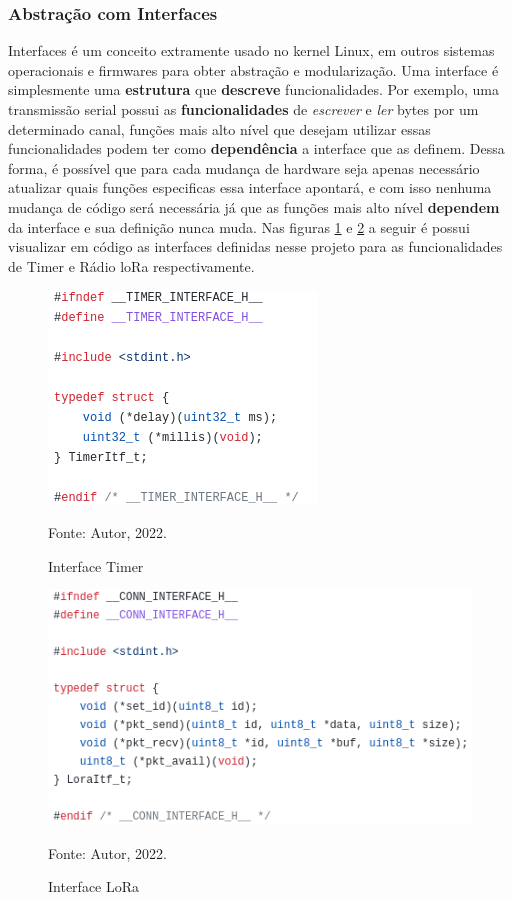\subsubsection{Abstração com Interfaces}

Interfaces é um conceito extramente usado no kernel Linux, em outros sistemas
operacionais e firmwares para obter abstração e modularização. Uma interface
é simplesmente uma \textbf{estrutura} que \textbf{descreve} funcionalidades. Por exemplo,
uma transmissão serial possui as \textbf{funcionalidades} de \textit{escrever}
e \textit{ler} bytes por um determinado canal, funções mais alto nível que desejam
utilizar essas funcionalidades podem ter como \textbf{dependência} a interface
que as definem. Dessa forma, é possível que para cada mudança de hardware
seja apenas necessário atualizar quais funções especificas essa interface apontará,
e com isso nenhuma mudança de código será necessária já que as funções mais alto
nível \textbf{dependem} da interface e sua definição nunca muda. Nas figuras
\ref{fig:itf-timer} e \ref{fig:itf-lora} a seguir é possui visualizar em código as interfaces
definidas nesse projeto para as funcionalidades de Timer e Rádio loRa respectivamente.

\begin{figure}[H]
    \centering
	\caption{Interface Timer}
    \includegraphics[height=0.19\textheight,keepaspectratio]{img/itf-timer.png}
    \label{fig:itf-timer}
    
    Fonte: Autor, 2022.
\end{figure}

\begin{figure}[H]
    \centering
	\caption{Interface LoRa}
    \includegraphics[height=0.2\textheight,keepaspectratio]{img/itf-lora.png}
    \label{fig:itf-lora}
    
    Fonte: Autor, 2022.
\end{figure}

